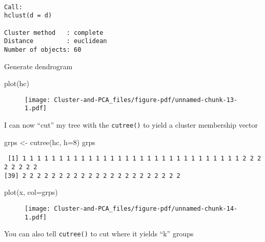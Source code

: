 \documentclass[
  letterpaper,
  DIV=11,
  numbers=noendperiod]{scrartcl}
\newenvironment{Shaded}{\begin{snugshade}}{\end{snugshade}}
\newcommand{\AttributeTok}[1]{\textcolor[rgb]{0.40,0.45,0.13}{#1}}
\newcommand{\DecValTok}[1]{\textcolor[rgb]{0.68,0.00,0.00}{#1}}
\newcommand{\FunctionTok}[1]{\textcolor[rgb]{0.28,0.35,0.67}{#1}}
\newcommand{\NormalTok}[1]{\textcolor[rgb]{0.00,0.23,0.31}{#1}}
\newcommand{\OtherTok}[1]{\textcolor[rgb]{0.00,0.23,0.31}{#1}}
\begin{document}
\begin{verbatim}

Call:
hclust(d = d)

Cluster method   : complete 
Distance         : euclidean 
Number of objects: 60 
\end{verbatim}

Generate dendrogram

\begin{Shaded}
\begin{Highlighting}[]
\FunctionTok{plot}\NormalTok{(hc)}
\end{Highlighting}
\end{Shaded}

\begin{figure}[H]

{\centering \texttt{[image: Cluster-and-PCA\_files/figure-pdf/unnamed-chunk-13-1.pdf]}

}

\end{figure}

I can now ``cut'' my tree with the \texttt{cutree()} to yield a cluster
membership vector

\begin{Shaded}
\begin{Highlighting}[]
\NormalTok{grps }\OtherTok{\textless{}{-}} \FunctionTok{cutree}\NormalTok{(hc, }\AttributeTok{h=}\DecValTok{8}\NormalTok{)}
\NormalTok{grps}
\end{Highlighting}
\end{Shaded}

\begin{verbatim}
 [1] 1 1 1 1 1 1 1 1 1 1 1 1 1 1 1 1 1 1 1 1 1 1 1 1 1 1 1 1 1 1 2 2 2 2 2 2 2 2
[39] 2 2 2 2 2 2 2 2 2 2 2 2 2 2 2 2 2 2 2 2 2 2
\end{verbatim}

\begin{Shaded}
\begin{Highlighting}[]
\FunctionTok{plot}\NormalTok{(x, }\AttributeTok{col=}\NormalTok{grps)}
\end{Highlighting}
\end{Shaded}

\begin{figure}[H]

{\centering \texttt{[image: Cluster-and-PCA\_files/figure-pdf/unnamed-chunk-14-1.pdf]}

}

\end{figure}

You can also tell \texttt{cutree()} to cut where it yields ``k'' groups
\end{document}
